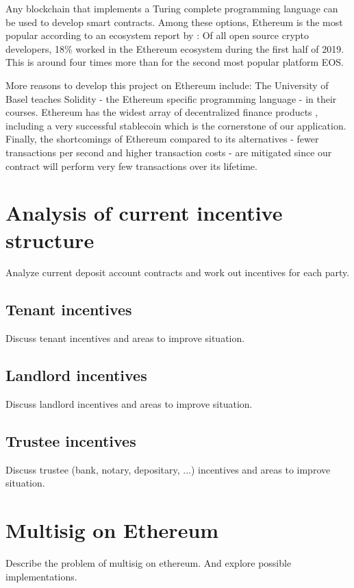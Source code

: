 \documentclass[12pt,a4paper,titlepage,oneside,english]{article}
\begin{document}
Any blockchain that implements a Turing complete programming language can be used to develop smart contracts. Among these options, Ethereum is the most popular according to an ecosystem report by \cite{ElectricCapital2019}: Of all open source crypto developers, 18\% worked in the Ethereum ecosystem during the first half of 2019. This is around four times more than for the second most popular platform EOS.

More reasons to develop this project on Ethereum include: The University of Basel teaches Solidity - the Ethereum specific programming language - in their courses. Ethereum has the widest array of decentralized finance products%
, including a very successful stablecoin which is the cornerstone of our application. Finally, the shortcomings of Ethereum compared to its alternatives - fewer transactions per second and higher transaction costs - are mitigated since our contract will perform very few transactions over its lifetime.




\section{Analysis of current incentive structure}
Analyze current deposit account contracts and work out incentives for each party.
\subsection{Tenant incentives}
Discuss tenant incentives and areas to improve situation.
\subsection{Landlord incentives}
Discuss landlord incentives and areas to improve situation.
\subsection{Trustee incentives}
Discuss trustee (bank, notary, depositary, ...) incentives and areas to improve situation.



\section{Multisig on Ethereum}
Describe the problem of multisig on ethereum. And explore possible implementations.
\end{document}
